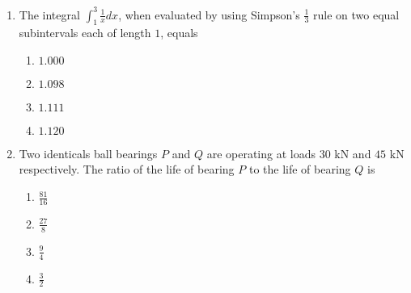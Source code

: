 \documentclass[journal,12pt,onecolumn]{IEEEtran}
\theoremstyle{remark}
\begin{document}
\begin{enumerate}
\item The integral $\int_{1}^{3} {\frac{1}{x} dx}$, when evaluated by using Simpson's $\frac{1}{3}$ rule on two equal subintervals each of length $1$, equals
\begin{enumerate}
\item $1.000$
\item $1.098$
\item $1.111$
\item $1.120$
\end{enumerate}

\item Two identicals ball bearings $P$ and $Q$ are operating at loads $30$ kN and $45$ kN respectively. The ratio of the life of bearing $P$ to the life of bearing $Q$ is
\begin{enumerate}
\item $\frac{81}{16}$
\item $\frac{27}{8}$
\item $\frac{9}{4}$
\item $\frac{3}{2}$
\end{enumerate}


\end{enumerate}
\end{document}
